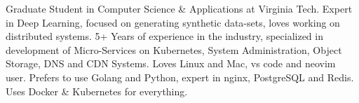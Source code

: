 

\begin{cvparagraph}


Graduate Student in Computer Science \& Applications at Virginia Tech. Expert in Deep Learning, focused on generating synthetic data-sets, loves working on distributed systems. 5+ Years of experience in the industry, specialized in development of Micro-Services on Kubernetes, System Administration, Object Storage, DNS and CDN Systems. Loves Linux and Mac, vs code and neovim user. Prefers to use Golang and Python, expert in nginx, PostgreSQL and Redis. Uses Docker \& Kubernetes for everything.

\end{cvparagraph}
